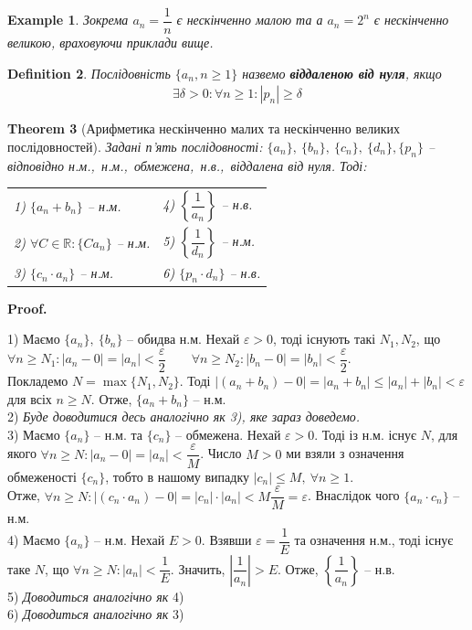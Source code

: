 \documentclass[a4paper, 14pt]{article}
\makeatletter
\def\qed{$\blacksquare$}
\theoremstyle{theoremdd}
\newtheorem{theorem}{Theorem}[subsection]
\theoremstyle{theoremdd}
\newtheorem{definition}[theorem]{Definition}
\theoremstyle{theoremdd}
\theoremstyle{theoremdd}
\newtheorem{example}[theorem]{Example}
\theoremstyle{theoremdd}
\theoremstyle{theoremdd}
\theoremstyle{theoremdd}
\theoremstyle{theoremdd}
\renewenvironment{proof}[1][Proof.\\]{\par
\pushQED{\hfill \qed}%
\normalfont \topsep6\p@\@plus6\p@\relax
\trivlist
\item\relax
{\bfseries
#1\@addpunct{.}}\hspace\labelsep\ignorespaces
}{%
\popQED\endtrivlist\@endpefalse
}
\makeatother
\begin{document}
	\begin{example}
	Зокрема $a_n = \dfrac{1}{n}$ є нескінченно малою та а $a_n = 2^n$ є нескінченно великою, враховуючи приклади вище.
	\end{example}
	
	\begin{definition}
	Послідовність $\{a_n, n \geq 1\}$ назвемо \textbf{віддаленою від нуля}, якщо
	\begin{align*}
	\exists \delta>0: \forall n\geq 1: |p_n|\geq \delta
	\end{align*}
	\end{definition}
	
	\begin{theorem}[Арифметика нескінченно малих та нескінченно великих послідовностей]
	Задані п'ять послідовності: $\{a_n\}, \ \{b_n\},\ \{c_n\},\ \{d_n\}, \{p_n\}$ -- відповідно н.м.,\ н.м.,\ обмежена,\ н.в.,\ віддалена від нуля. Тоді:\\
	\begin{tabular}{ll}
	1) $\{a_n+b_n\}$ -- н.м. & 4) $\left\{ \dfrac{1}{a_n} \right\}$ -- н.в. \\
	2) $\forall C \in \mathbb{R}: \{C a_n\}$ -- н.м. & 5) $\left\{ \dfrac{1}{d_n} \right\}$ -- н.м. \\
	3) $\{c_n \cdot a_n\}$ -- н.м. & 6) $\{p_n \cdot d_n \}$ -- н.в.
	\end{tabular}
	\end{theorem}
	
	\begin{proof}
	1) Маємо $\{a_n\},\ \{b_n\}$ -- обидва н.м. Нехай $\varepsilon > 0$, тоді існують такі $N_1,N_2$, що \\
	$\forall n \geq N_1: |a_n-0| = |a_n| < \dfrac{\varepsilon}{2} \qquad \forall n \geq N_2: |b_n-0| = |b_n| < \dfrac{\varepsilon}{2}$.\\
	Покладемо $N = \max\{N_1,N_2\}$. Тоді $|(a_n+b_n)-0| = |a_n+b_n| \leq |a_n|+|b_n| < \varepsilon$ для всіх $n \geq N$. Отже, $\{a_n+b_n\}$ -- н.м.
	\bigskip \\
	2) \textit{Буде доводитися десь аналогічно як 3), яке зараз доведемо.}
	\bigskip \\
	3) Маємо $\{a_n\}$ -- н.м. та $\{c_n\}$ -- обмежена. Нехай $\varepsilon > 0$. Тоді із н.м. існує $N$, для якого $\forall n \geq N: |a_n-0| = |a_n| < \dfrac{\varepsilon}{M}$. Число $M > 0$ ми взяли з означення обмеженості $\{c_n\}$, тобто в нашому випадку $|c_n| \leq M,\ \forall n \geq 1$. \\
	Отже, $\forall n \geq N: | (c_n \cdot a_n) - 0| = |c_n| \cdot |a_n| < M \dfrac{\varepsilon}{M} = \varepsilon$. Внаслідок чого $\{a_n \cdot c_n\}$ -- н.м.
	\bigskip \\
	4) Маємо $\{a_n\}$ -- н.м. Нехай $E > 0$. Взявши $\varepsilon = \dfrac{1}{E}$ та означення н.м., тоді існує таке $N$, що $\forall n \geq N: |a_n| < \dfrac{1}{E}$. Значить, $\left| \dfrac{1}{a_n} \right| > E$. Отже, $\left\{ \dfrac{1}{a_n} \right\}$ -- н.в.
	\bigskip \\
	5) \textit{Доводиться аналогічно як} 4)
	\bigskip \\
	6) \textit{Доводиться аналогічно як} 3)
	\end{proof}
	
\end{document}
